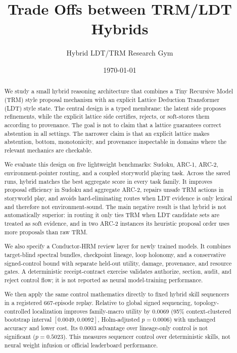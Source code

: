 \documentclass[11pt]{article}
\title{Trade Offs between TRM/LDT Hybrids}
\author{Hybrid LDT/TRM Research Gym}
\date{\today}
\begin{document}
\maketitle

\begin{abstract}
We study a small hybrid reasoning architecture that combines a Tiny Recursive Model (TRM) style proposal mechanism with an explicit Lattice Deduction Transformer (LDT) style state. The central design is a typed membrane: the latent side proposes refinements, while the explicit lattice side certifies, rejects, or soft-stores them according to provenance. The goal is not to claim that a lattice guarantees correct abstention in all settings. The narrower claim is that an explicit lattice makes abstention, bottom, monotonicity, and provenance inspectable in domains where the relevant mechanics are checkable.

We evaluate this design on five lightweight benchmarks: Sudoku, ARC-1, ARC-2, environment-pointer routing, and a coupled storyworld playing task. Across the saved runs, hybrid matches the best aggregate score in every task family. It improves proposal efficiency in Sudoku and aggregate ARC-2, repairs unsafe TRM actions in storyworld play, and avoids hard-eliminating routes when LDT evidence is only lexical and therefore not environment-sound. The main negative result is that hybrid is not automatically superior: in routing it only ties TRM when LDT candidate sets are treated as soft evidence, and in two ARC-2 instances its heuristic proposal order uses more proposals than raw TRM.

We also specify a Conductor-HRM review layer for newly trained models. It combines target-blind spectral bundles, checkpoint lineage, loop holonomy, and a conservative signed-control bound with separate held-out utility, damage, provenance, and resource gates. A deterministic receipt-contract exercise validates authorize, section, audit, and reject control flow; it is not reported as neural model-training performance.

We then apply the same control mathematics directly to fixed hybrid skill sequencers in a registered 667-episode replay. Relative to global signed sequencing, topology-controlled localization improves family-macro utility by $0.0069$ (95\% context-clustered bootstrap interval $[0.0049,0.0092]$, Holm-adjusted $p=0.0006$) with unchanged accuracy and lower cost. Its $0.0003$ advantage over lineage-only control is not significant ($p=0.5023$). This measures sequencer control over deterministic skills, not neural weight infusion or official leaderboard performance.


\end{abstract}
\end{document}
